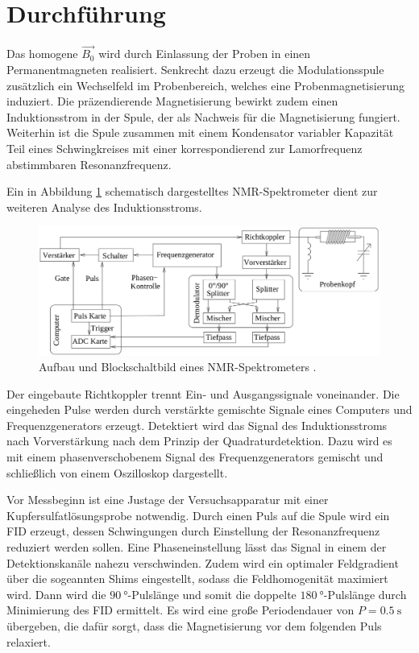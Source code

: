 \section{Durchführung}
\label{sec:Durchführung}

Das homogene $\vec{B_0}$ wird durch Einlassung der Proben in einen Permanentmagneten 
realisiert. Senkrecht dazu erzeugt die Modulationsspule zusätzlich ein Wechselfeld im Probenbereich,
welches eine Probenmagnetisierung induziert. Die präzendierende Magnetisierung
bewirkt zudem einen Induktionsstrom in der Spule, der als Nachweis für die Magnetisierung fungiert.
Weiterhin ist die Spule zusammen mit einem Kondensator variabler Kapazität Teil eines Schwingkreises
mit einer korrespondierend zur Lamorfrequenz abstimmbaren Resonanzfrequenz.

Ein in Abbildung \ref{fig:aufbau} schematisch dargestelltes NMR-Spektrometer dient zur weiteren
Analyse des Induktionsstroms.

\begin{figure}
    \centering
    \includegraphics[scale=0.4]{content/aufbau.png}
    \caption{Aufbau und Blockschaltbild eines NMR-Spektrometers \cite{Anleitung2}.}
    \label{fig:aufbau}
\end{figure}

Der eingebaute Richtkoppler trennt Ein- und Ausgangssignale voneinander.
Die eingeheden Pulse werden durch verstärkte gemischte Signale eines Computers und Frequenzgenerators erzeugt.
Detektiert wird das Signal des Induktionsstroms nach Vorverstärkung nach dem Prinzip der Quadraturdetektion.
Dazu wird es mit einem phasenverschobenem Signal des Frequenzgenerators gemischt und schließlich von einem
Oszilloskop dargestellt.

Vor Messbeginn ist eine Justage der Versuchsapparatur mit einer Kupfersulfatlösungsprobe notwendig.
Durch einen Puls auf die Spule wird ein FID erzeugt, dessen Schwingungen durch Einstellung der Resonanzfrequenz
reduziert werden sollen. Eine Phaseneinstellung lässt das Signal in einem der Detektionskanäle
nahezu verschwinden.
Zudem wird ein optimaler Feldgradient über die sogeannten Shims eingestellt, sodass die 
Feldhomogenität maximiert wird.
Dann wird die $\SI{90}{\degree}$-Pulslänge und somit die doppelte $\SI{180}{\degree}$-Pulslänge
durch Minimierung des FID ermittelt.
Es wird eine große Periodendauer von $P = \SI{0.5}{\second}$ übergeben, die dafür sorgt,
dass die Magnetisierung vor dem folgenden Puls relaxiert.

